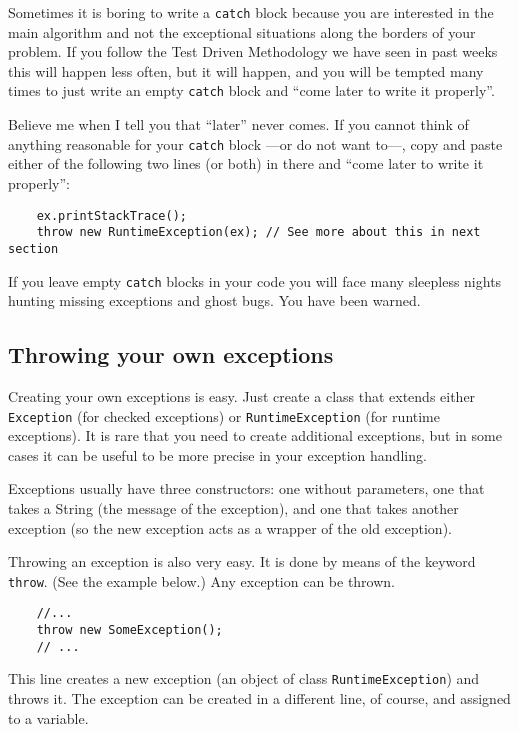 Sometimes it is boring to write a \verb+catch+ block because you are
interested in the main algorithm and not the exceptional situations
along the borders of your problem. If you follow the Test Driven
Methodology we have seen in past weeks this will happen less often,
but it will happen, and you will be tempted many times to just write
an empty \verb+catch+ block and ``come later to write it
properly''. 

Believe me when I tell you that ``later'' never comes. If you cannot
think of anything reasonable for your \verb+catch+ block ---or do not
want to---, copy and paste either of the following two lines (or
both) in there and ``come later to write it properly'': 

\begin{verbatim}
    ex.printStackTrace();
    throw new RuntimeException(ex); // See more about this in next section
\end{verbatim}

If you leave empty \verb+catch+ blocks in your code you will face many
sleepless nights hunting missing exceptions and ghost bugs. You have
been warned. 

\subsection{Throwing your own exceptions}
\label{sec:throwing-your-own}

Creating your own exceptions is easy. Just create a class that extends
either \verb+Exception+ (for checked exceptions) or
\verb+RuntimeException+ (for runtime exceptions). It is rare that you
need to create additional exceptions, but in some cases it can be
useful to be more precise in your exception handling. 

Exceptions usually have three constructors: one without parameters,
one that takes a String (the message of the exception), and one that
takes another exception (so the new exception acts as a wrapper of the
old exception). 

Throwing an exception is also very easy. It is done by means of the
keyword \verb+throw+. 
(See the example below.)
Any exception can be thrown. 

\begin{verbatim}
    //...
    throw new SomeException();
    // ...
\end{verbatim}

This line creates a new exception (an object of class
\verb+RuntimeException+) and throws it. The exception can be created
in a different line, of course, and assigned to a variable. 



